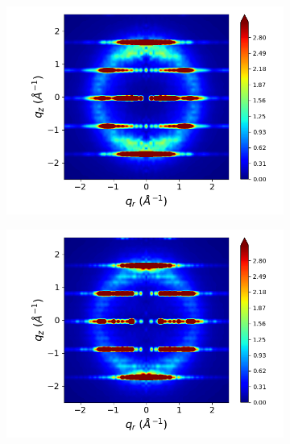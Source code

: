 \documentclass[journal=jpcbfk,manuscript=article]{achemso}
\begin{document}
\begin{figure}[!htb]
\begin{subfigure}{0.3\linewidth}
  	\label{fig:staggered_rzplot_restrained}
  \end{subfigure}
  \begin{subfigure}{0.3\linewidth}
  	\centering
  	\includegraphics[width=\textwidth]{rotated_monomers_rzplot_restrained.png}
  	\label{fig:rotated_monomers_rzplot_restrained}
  \end{subfigure}
  \begin{subfigure}{0.3\linewidth}
  	\centering
  	\includegraphics[width=\textwidth]{solvated_pore_rzplot_restrained.png}
  	\label{fig:solvated_pore_rzplot_restrained}
  \end{subfigure}

\end{figure}
\end{document}
